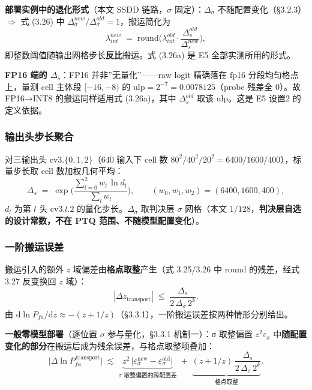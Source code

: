 \textbf{部署实例中的退化形式}（本文 SSDD 链路，\(\sigma\)
固定）：\(\Delta_\sigma\) 不随配置变化（§3.2.3）\(\Rightarrow\) 式
(3.26) 中 \(\Delta_\sigma^{new}/\Delta_\sigma^{old}=1\)，搬运简化为 \[
\lambda_{int}^{new}\;=\;\mathrm{round}\!\Big(\lambda_{int}^{old}\cdot\frac{\Delta_s^{old}}{\Delta_s^{new}}\Big),
\tag{3.26a}
\] 即整数阈值随输出网格步长\textbf{反比}搬运。式 (3.26a) 是 E5
全部实测所用的形式。

\textbf{FP16 端的 \(\Delta_s\)}：FP16 并非''无量化''------raw logit
精确落在 fp16 分段均匀格点上，量测 cell 主体段 \([-16,-8)\) 的
\(\mathrm{ulp}=2^{-7}=0.0078125\)（probe 残差全 0）。故 FP16→INT8
的搬运同样适用式 (3.26a)，其中 \(\Delta_s^{old}\) 取该 ulp。这是 E5
设置2 的定义依据。

\subsubsection{输出头步长聚合}\label{ux8f93ux51faux5934ux6b65ux957fux805aux5408}

对三输出头 \(\mathrm{cv3}.\{0,1,2\}\)（\(640\) 输入下 cell 数
\(80^2/40^2/20^2=6400/1600/400\)），标量步长取 cell 数加权几何平均： \[
\Delta_s \;=\; \exp\!\Big(\frac{\sum_{l=0}^{2} w_l\,\ln d_l}{\sum_l w_l}\Big),
\qquad (w_0,w_1,w_2)=(6400,1600,400),
\tag{3.28}
\] \(d_l\) 为第 \(l\) 头 \(\mathrm{cv3}.l.2\)
的量化步长。\(\Delta_\sigma\) 取判决层 \(\sigma\) 网格（本文
\(1/128\)，\textbf{判决层自选的设计常数，不在 PTQ
范围、不随模型配置变化}）。

\subsubsection{一阶搬运误差}\label{ux4e00ux9636ux642cux8fd0ux8befux5dee}

搬运引入的额外 \(z\) 域偏差由\textbf{格点取整}产生（式 3.25/3.26 中
round 的残差，经式 3.27 反变换回 \(z\) 域）： \[
|\Delta z_{\mathrm{transport}}| \;\le\; \frac{\Delta_s}{2\,\Delta_\sigma\, 2^{k}} .
\] 由
\(\mathrm{d}\ln P_{fa}/\mathrm{d}z \approx -(z+1/z)\)（§3.3.1），一阶搬运误差按两种情形分别给出。

\textbf{一般零模型部署}（逐位置 \(\sigma\) 参与量化，§3.3.1 机制一）：σ
取整偏置 \(z^2\varepsilon_\sigma\)
中\textbf{随配置变化的部分}在搬运后成为残余误差，与格点取整项叠加： \[
\big|\Delta\ln P_{fa}^{\,\mathrm{transport}}\big|
\;\lesssim\;
\underbrace{z^{2}\,\big|\varepsilon_\sigma^{\mathrm{new}}-\varepsilon_\sigma^{\mathrm{old}}\big|}_{\text{σ 取整偏置的跨配置差}}
\;+\;
\underbrace{(z+1/z)\,\frac{\Delta_s}{2\,\Delta_\sigma\, 2^{k}}}_{\text{格点取整}} .
\tag{3.29}
\]

